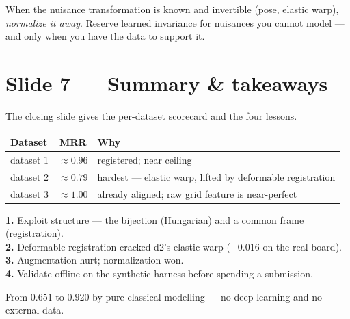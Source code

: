 \documentclass[12pt,a4paper]{article}   %
\begin{document}
\begin{compression}
When the nuisance transformation is known and invertible (pose, elastic warp), \emph{normalize it
away}. Reserve learned invariance for nuisances you cannot model --- and only when you have the data
to support it.
\end{compression}

\section{Slide 7 --- Summary \& takeaways}
The closing slide gives the per-dataset scorecard and the four lessons.

\begin{center}\begin{tabularx}{\textwidth}{@{}l c X@{}}
\toprule
\textbf{Dataset} & \textbf{MRR} & \textbf{Why}\\
\midrule
dataset 1 & $\approx0.96$ & registered; near ceiling\\
dataset 2 & $\approx0.79$ & hardest --- elastic warp, lifted by deformable registration\\
dataset 3 & $\approx1.00$ & already aligned; raw grid feature is near-perfect\\
\bottomrule
\end{tabularx}\end{center}

\begin{compression}
\textbf{1.} Exploit structure --- the bijection (Hungarian) and a common frame (registration).\\
\textbf{2.} Deformable registration cracked d2's elastic warp ($+0.016$ on the real board).\\
\textbf{3.} Augmentation hurt; normalization won.\\
\textbf{4.} Validate offline on the synthetic harness before spending a submission.
\end{compression}

From $0.651$ to $0.920$ by pure classical modelling --- no deep learning and no external data.

\end{document}
